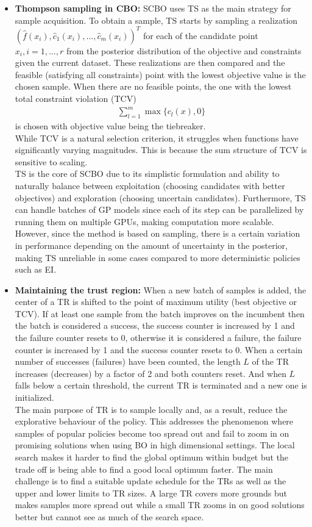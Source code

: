 \begin{itemize}
    \item \textbf{Thompson sampling in CBO:} SCBO uses TS as the main strategy for sample acquisition. To obtain a sample, TS starts by sampling a realization $(\hat{f}(x_i),\hat{c}_1(x_i),\ldots,\hat{c}_m(x_i))^T$ for each of the candidate point $x_i,i=1,\ldots,r$ from the posterior distribution of the objective and constraints given the current dataset. These realizations are then compared and the feasible (satisfying all constraints) point with the lowest objective value is the chosen sample. When there are no feasible points, the one with the lowest total constraint violation (TCV)
    \begin{align}
        \sum_{l=1}^m\max\{c_l(x),0\}
    \end{align}
    is chosen with objective value being the tiebreaker.\\
    While TCV is a natural selection criterion, it struggles when functions have significantly varying magnitudes. This is because the sum structure of TCV is sensitive to scaling.\\
    TS is the core of SCBO due to its simplistic formulation and ability to naturally balance between exploitation (choosing candidates with better objectives) and exploration (choosing uncertain candidates). Furthermore,
    TS can handle batches of GP models since each of its step can be parallelized by running them on multiple GPUs, making computation more scalable. However, since the method is based on sampling, there is a certain variation in performance depending on the amount of uncertainty in the posterior, making TS unreliable in some cases compared to more deterministic policies such as EI.
    \item \textbf{Maintaining the trust region:} When a new batch of samples is added, the center of a TR is shifted to the point of maximum utility (best objective or TCV). If at least one sample from the batch improves on the incumbent then the batch is considered a success, the success counter is increased by 1 and the failure counter resets to 0, otherwise it is considered a failure, the failure counter is increased by 1 and the success counter resets to 0. When a certain number of successes (failures) have been counted, the length $L$ of the TR increases (decreases) by a factor of 2 and both counters reset. And when $L$ falls below a certain threshold, the current TR is terminated and a new one is initialized.\\
    The main purpose of TR is to sample locally and, as a result, reduce the explorative behaviour of the policy. This addresses the phenomenon where samples of popular policies become too spread out and fail to zoom in on promising solutions when using BO in high dimensional settings. The local search makes it harder to find the global optimum within budget but the trade off is being able to find a good local optimum faster. The main challenge is to find a suitable update schedule for the TRs as well as the upper and lower limits to TR sizes. A large TR covers more grounds but makes samples more spread out while a small TR zooms in on good solutions better but cannot see as much of the search space.

\end{itemize}
